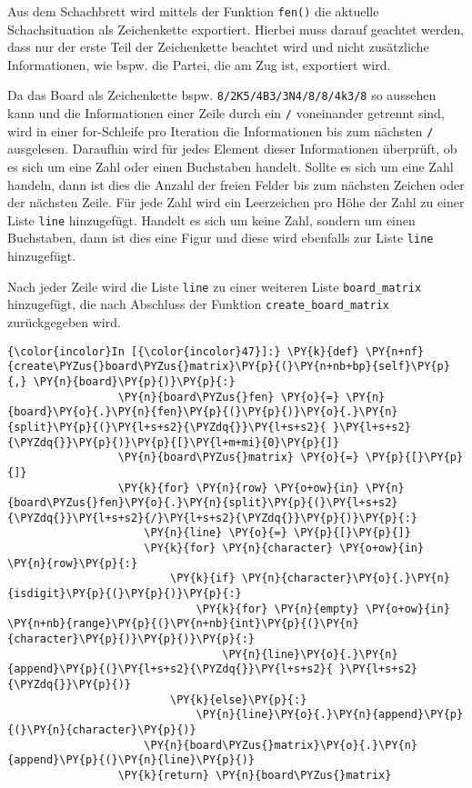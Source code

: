 Aus dem Schachbrett wird mittels der Funktion \texttt{fen()} die
aktuelle Schachsituation als Zeichenkette exportiert. Hierbei muss
darauf geachtet werden, dass nur der erste Teil der Zeichenkette
beachtet wird und nicht zusätzliche Informationen, wie bspw. die Partei,
die am Zug ist, exportiert wird.

Da das Board als Zeichenkette bspw. \texttt{8/2K5/4B3/3N4/8/8/4k3/8} so
aussehen kann und die Informationen einer Zeile durch ein \texttt{/}
voneinander getrennt sind, wird in einer for-Schleife pro Iteration die
Informationen bis zum nächsten \texttt{/} ausgelesen. Daraufhin wird für
jedes Element dieser Informationen überprüft, ob es sich um eine Zahl
oder einen Buchstaben handelt. Sollte es sich um eine Zahl handeln, dann
ist dies die Anzahl der freien Felder bis zum nächsten Zeichen oder der
nächsten Zeile. Für jede Zahl wird ein Leerzeichen pro Höhe der Zahl zu
einer Liste \texttt{line} hinzugefügt. Handelt es sich um keine Zahl,
sondern um einen Buchstaben, dann ist dies eine Figur und diese wird
ebenfalls zur Liste \texttt{line} hinzugefügt.

Nach jeder Zeile wird die Liste \texttt{line} zu einer weiteren Liste
\texttt{board\_matrix} hinzugefügt, die nach Abschluss der Funktion
\texttt{create\_board\_matrix} zurückgegeben wird.

    \begin{Verbatim}[commandchars=\\\{\}]
{\color{incolor}In [{\color{incolor}47}]:} \PY{k}{def} \PY{n+nf}{create\PYZus{}board\PYZus{}matrix}\PY{p}{(}\PY{n+nb+bp}{self}\PY{p}{,} \PY{n}{board}\PY{p}{)}\PY{p}{:}
                 \PY{n}{board\PYZus{}fen} \PY{o}{=} \PY{n}{board}\PY{o}{.}\PY{n}{fen}\PY{p}{(}\PY{p}{)}\PY{o}{.}\PY{n}{split}\PY{p}{(}\PY{l+s+s2}{\PYZdq{}}\PY{l+s+s2}{ }\PY{l+s+s2}{\PYZdq{}}\PY{p}{)}\PY{p}{[}\PY{l+m+mi}{0}\PY{p}{]}
                 \PY{n}{board\PYZus{}matrix} \PY{o}{=} \PY{p}{[}\PY{p}{]}
                 \PY{k}{for} \PY{n}{row} \PY{o+ow}{in} \PY{n}{board\PYZus{}fen}\PY{o}{.}\PY{n}{split}\PY{p}{(}\PY{l+s+s2}{\PYZdq{}}\PY{l+s+s2}{/}\PY{l+s+s2}{\PYZdq{}}\PY{p}{)}\PY{p}{:}
                     \PY{n}{line} \PY{o}{=} \PY{p}{[}\PY{p}{]}
                     \PY{k}{for} \PY{n}{character} \PY{o+ow}{in} \PY{n}{row}\PY{p}{:}
                         \PY{k}{if} \PY{n}{character}\PY{o}{.}\PY{n}{isdigit}\PY{p}{(}\PY{p}{)}\PY{p}{:}
                             \PY{k}{for} \PY{n}{empty} \PY{o+ow}{in} \PY{n+nb}{range}\PY{p}{(}\PY{n+nb}{int}\PY{p}{(}\PY{n}{character}\PY{p}{)}\PY{p}{)}\PY{p}{:}
                                 \PY{n}{line}\PY{o}{.}\PY{n}{append}\PY{p}{(}\PY{l+s+s2}{\PYZdq{}}\PY{l+s+s2}{ }\PY{l+s+s2}{\PYZdq{}}\PY{p}{)}
                         \PY{k}{else}\PY{p}{:} 
                             \PY{n}{line}\PY{o}{.}\PY{n}{append}\PY{p}{(}\PY{n}{character}\PY{p}{)}
                     \PY{n}{board\PYZus{}matrix}\PY{o}{.}\PY{n}{append}\PY{p}{(}\PY{n}{line}\PY{p}{)}
                 \PY{k}{return} \PY{n}{board\PYZus{}matrix}
\end{Verbatim}

